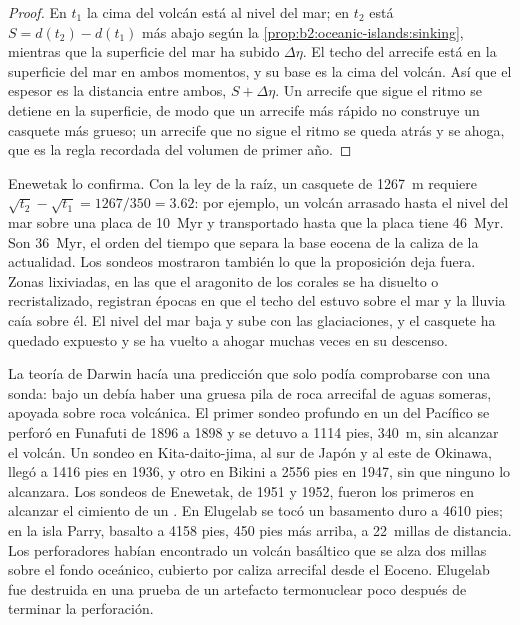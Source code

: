 \begin{proof}
En $t_1$ la cima del volcán está al nivel del mar; en $t_2$ está $S = d(t_2) - d(t_1)$ más abajo según la
\cref{prop:b2:oceanic-islands:sinking}, mientras que la superficie del mar ha subido $\Delta\eta$. El techo
del arrecife está en la superficie del mar en ambos momentos, y su base es la cima del volcán. Así que el
espesor es la distancia entre ambos, $S + \Delta\eta$. Un arrecife que sigue el ritmo se detiene en la
superficie, de modo que un arrecife más rápido no construye un casquete más grueso; un arrecife que no sigue el ritmo se queda atrás
y se ahoga, que es la regla recordada del volumen de primer año.
\end{proof}

Enewetak lo confirma. Con la ley de la raíz, un casquete de \qty{1267}{m} requiere $\sqrt{t_2} - \sqrt{t_1} =
1267/350 = 3.62$: por ejemplo, un volcán arrasado hasta el nivel del mar sobre una placa de \qty{10}{Myr} y
transportado hasta que la placa tiene \qty{46}{Myr}. Son \qty{36}{Myr}, el orden del tiempo que
separa la base eocena de la caliza de la actualidad. Los sondeos mostraron también lo que la
proposición deja fuera. Zonas lixiviadas, en las que el aragonito de los corales se ha disuelto o
recristalizado, registran épocas en que el techo del  estuvo sobre el mar y la lluvia caía sobre él.
El nivel del mar baja y sube con las glaciaciones, y el casquete ha quedado expuesto y se ha vuelto a ahogar muchas
veces en su descenso.

\begin{history}
La teoría de Darwin hacía una predicción que solo podía comprobarse con una sonda: bajo un  debía
haber una gruesa pila de roca arrecifal de aguas someras, apoyada sobre roca volcánica. El primer sondeo profundo
en un  del Pacífico se perforó en Funafuti de 1896 a 1898 y se detuvo a 1114 pies,
\qty{340}{m}, sin alcanzar el volcán. Un sondeo en Kita-daito-jima, al sur de Japón y al este de Okinawa,
llegó a 1416 pies en 1936, y otro en Bikini a 2556 pies en 1947, sin que ninguno lo alcanzara. Los sondeos de Enewetak, de
1951 y 1952, fueron los primeros en alcanzar el cimiento de un . En Elugelab se tocó un basamento duro
a 4610 pies; en la isla Parry, basalto a 4158 pies, 450 pies más arriba, a \num{22}~millas
de distancia. Los perforadores habían encontrado un volcán basáltico que se alza dos millas sobre el fondo oceánico, cubierto
por caliza arrecifal desde el Eoceno. Elugelab fue destruida en una prueba de un artefacto termonuclear
poco después de terminar la perforación.
\end{history}

